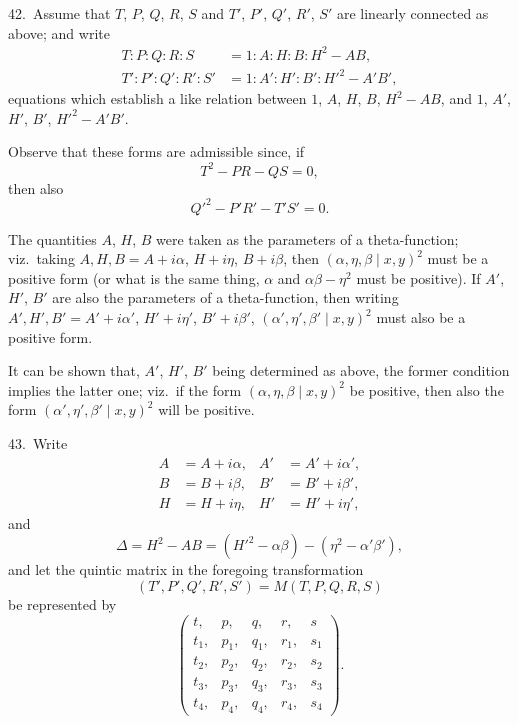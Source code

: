 \documentclass[11pt,a4paper]{book}
\begin{document}
42.\ Assume that $T$, $P$, $Q$, $R$, $S$ and $T'$, $P'$, $Q'$, $R'$, $S'$ are linearly connected as above; and write
\begin{align*}
T : P : Q : R : S &= 1 : A : H : B : H^2 - AB,\\
T' : P' : Q' : R' : S' &= 1 : A' : H' : B' : H'^2 - A'B',
\end{align*}
equations which establish a like relation between $1$, $A$, $H$, $B$, $H^2 - AB$, and $1$, $A'$, $H'$, $B'$, $H'^2 - A'B'$.

Observe that these forms are admissible since, if
\[
T^2 - PR - QS = 0,
\]
then also
\[
Q'^2 - P'R' - T'S' = 0.
\]

The quantities $A$, $H$, $B$ were taken as the parameters of a theta-function; viz.\ taking $A, H, B = A + i\alpha$, $H + i\eta$, $B + i\beta$, then $(\alpha, \eta, \beta \mid x, y)^2$ must be a positive form (or what is the same thing, $\alpha$ and $\alpha\beta - \eta^2$ must be positive). If $A'$, $H'$, $B'$ are also the parameters of a theta-function, then writing $A', H', B' = A' + i\alpha'$, $H' + i\eta'$, $B' + i\beta'$, $(\alpha', \eta', \beta' \mid x, y)^2$ must also be a positive form.

It can be shown that, $A'$, $H'$, $B'$ being determined as above, the former condition implies the latter one; viz.\ if the form $(\alpha, \eta, \beta \mid x, y)^2$ be positive, then also the form $(\alpha', \eta', \beta' \mid x, y)^2$ will be positive.

\medskip

43.\ Write
\begin{align*}
A &= A + i\alpha, & A' &= A' + i\alpha',\\
B &= B + i\beta, & B' &= B' + i\beta',\\
H &= H + i\eta, & H' &= H' + i\eta',
\end{align*}
and
\[
\Delta = H^2 - AB = (H'^2 - \alpha\beta) - (\eta^2 - \alpha'\beta'),
\]
and let the quintic matrix in the foregoing transformation
\[
(T', P', Q', R', S') = M(T, P, Q, R, S)
\]
be represented by
\[
\begin{pmatrix}
t, & p, & q, & r, & s\\
t_1, & p_1, & q_1, & r_1, & s_1\\
t_2, & p_2, & q_2, & r_2, & s_2\\
t_3, & p_3, & q_3, & r_3, & s_3\\
t_4, & p_4, & q_4, & r_4, & s_4
\end{pmatrix}.
\]

\newpage
\end{document}
